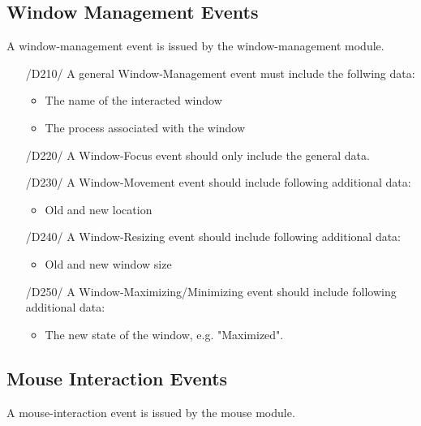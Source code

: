 \subsection{Window Management Events}

A window-management event is issued by the window-management module.

\begin{itemize}
\item[/D210/] A general Window-Management event must include the follwing data:
	\begin{itemize}
	\item The name of the interacted window
	\item The process associated with the window
	\end{itemize}

\item[/D220/] A Window-Focus event should only include the general data.

\item[/D230/] A Window-Movement event should include following additional data:
	\begin{itemize}
	\item Old and new location
	\end{itemize}
	
\item[/D240/] A Window-Resizing event should include following additional data:
	\begin{itemize}
	\item Old and new window size
	\end{itemize}
	
\item[/D250/] A Window-Maximizing/Minimizing event should include following additional data:
	\begin{itemize}
	\item The new state of the window, e.g. "Maximized".
	\end{itemize}
\end{itemize}

\subsection{Mouse Interaction Events}

A mouse-interaction event is issued by the mouse module.

